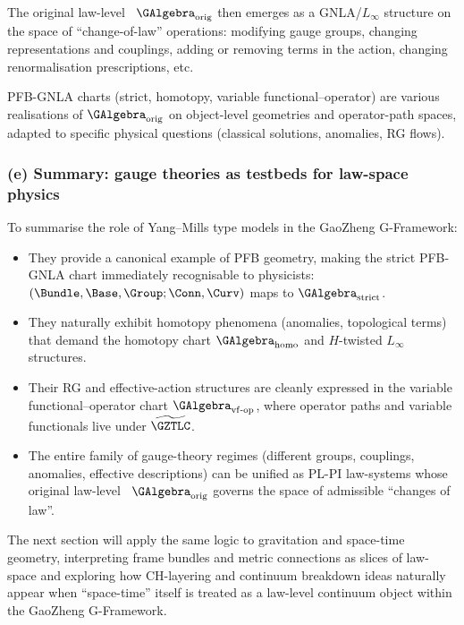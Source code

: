 \documentclass[11pt]{book}
\theoremstyle{plain}
\theoremstyle{definition}
\begin{document}
The original law-level \GAlgebra\ $\GAlgebra_{\mathrm{orig}}$ then
emerges as a GNLA/$L_\infty$ structure on the space of “change-of-law”
operations: modifying gauge groups, changing representations and
couplings, adding or removing terms in the action, changing
renormalisation prescriptions, etc.

PFB-GNLA charts (strict, homotopy, variable functional--operator) are
various realisations of $\GAlgebra_{\mathrm{orig}}$ on object-level
geometries and operator-path spaces, adapted to specific physical
questions (classical solutions, anomalies, RG flows).



\subsubsection*{(e) Summary: gauge theories as testbeds for law-space physics}

To summarise the role of Yang--Mills type models in the GaoZheng
G-Framework:

\begin{itemize}
  \item They provide a canonical example of PFB geometry, making the
        strict PFB-GNLA chart immediately recognisable to physicists:
        $(\Bundle,\Base,\Group;\Conn,\Curv)$ maps to
        $\GAlgebra_{\mathrm{strict}}$.
  \item They naturally exhibit homotopy phenomena (anomalies, topological
        terms) that demand the homotopy chart
        $\GAlgebra_{\mathrm{homo}}$ and $H$-twisted $L_\infty$
        structures.
  \item Their RG and effective-action structures are cleanly expressed
        in the variable functional--operator chart
        $\GAlgebra_{\mathrm{vf\text- op}}$, where operator paths and
        variable functionals live under $\widetilde{\GZTLC}$.
  \item The entire family of gauge-theory regimes (different groups,
        couplings, anomalies, effective descriptions) can be unified as
        PL-PI law-systems whose original law-level \GAlgebra\
        $\GAlgebra_{\mathrm{orig}}$ governs the space of admissible
        “changes of law”.
\end{itemize}

The next section will apply the same logic to gravitation and
space-time geometry, interpreting frame bundles and metric connections
as slices of law-space and exploring how CH-layering and continuum
breakdown ideas naturally appear when “space-time” itself is treated as
a law-level continuum object within the GaoZheng G-Framework.
\end{document}
